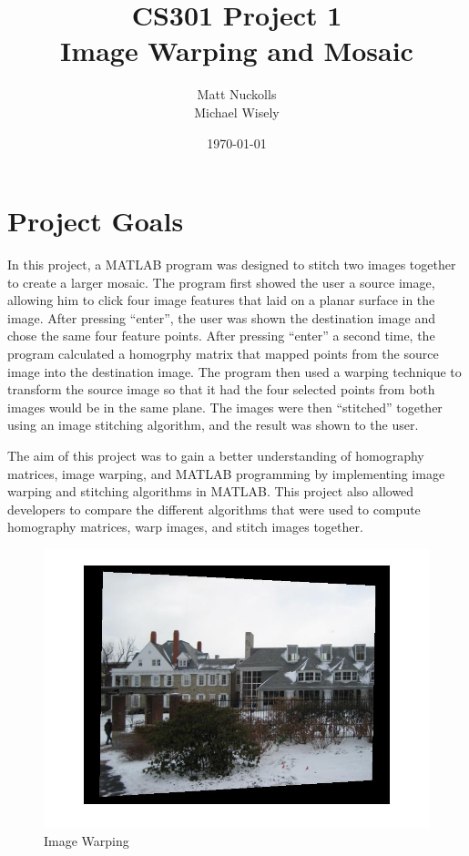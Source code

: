 \documentclass[11pt, letterpaper]{article}
\title{CS301 Project 1\\Image Warping and Mosaic}
\author{ Matt  Nuckolls \\ 
         Michael Wisely \\ }
\date{\today}
\begin{document}
\maketitle

\section{Project Goals}
In this project, a MATLAB program was designed to stitch two images
together to create a larger mosaic. The program first showed the user
a source image, allowing him to click four image features that laid on
a planar surface in the image. After pressing ``enter'', the user was
shown the destination image and chose the same four feature
points. After pressing ``enter'' a second time, the program calculated
a homogrphy matrix that mapped points from the source image into the
destination image. The program then used a warping technique to
transform the source image so that it had the four selected points
from both images would be in the same plane. The images were then
``stitched'' together using an image stitching algorithm, and the
result was shown to the user.

The aim of this project was to gain a better understanding of
homography matrices, image warping, and MATLAB programming by
implementing image warping and stitching algorithms in MATLAB. This
project also allowed developers to compare the different algorithms
that were used to compute homography matrices, warp images, and stitch
images together.

\begin{figure}[here]
\includegraphics[width=\textwidth]{../pics/snow-backward-bilinear-warp.jpg}
\caption{Image Warping}
\end{figure}
\end{document}
